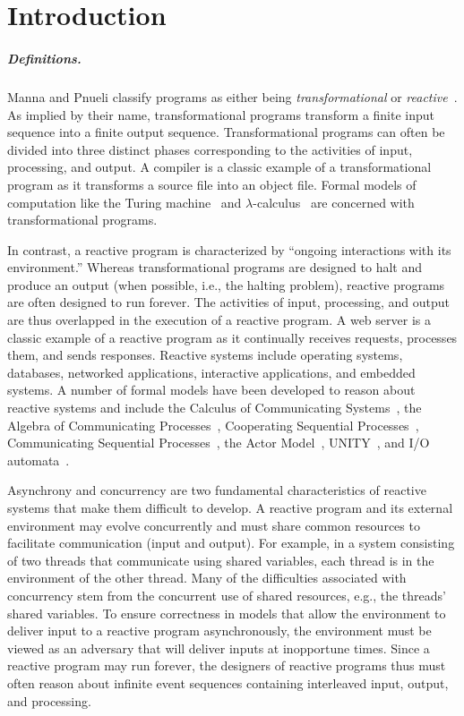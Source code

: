 \chapter{Introduction \label{introduction}}

\paragraph{Definitions.}
Manna and Pnueli classify programs as either being \emph{transformational} or \emph{reactive}~\cite{manna1992temporal}.
As implied by their name, transformational programs transform a finite input sequence into a finite output sequence.
Transformational programs can often be divided into three distinct phases corresponding to the activities of input, processing, and output.
A compiler is a classic example of a transformational program as it transforms a source file into an object file.
Formal models of computation like the Turing machine~\cite{turing1936computable} and $\lambda$-calculus~\cite{church1936unsolvable} are concerned with transformational programs.

In contrast, a reactive program is characterized by ``ongoing interactions with its environment\cite{manna1992temporal}.''
Whereas transformational programs are designed to halt and produce an output (when possible, i.e., the halting problem), reactive programs are often designed to run forever.
The activities of input, processing, and output are thus overlapped in the execution of a reactive program.
A web server is a classic example of a reactive program as it continually receives requests, processes them, and sends responses.
Reactive systems include operating systems, databases, networked applications, interactive applications, and embedded systems.
A number of formal models have been developed to reason about reactive systems and include the Calculus of Communicating Systems~\cite{milner1982calculus}, the Algebra of Communicating Processes~\cite{bergstra1982fixed}, Cooperating Sequential Processes~\cite{dijkstra1965cooperating}, Communicating Sequential Processes~\cite{hoare1978communicating}, the Actor Model~\cite{hewitt1973universal}\cite{clinger1981foundations}\cite{agha1985actors}, UNITY~\cite{chandy1989parallel}, and I/O automata~\cite{nancy1996distributed}.

Asynchrony and concurrency are two fundamental characteristics of reactive systems that make them difficult to develop.
A reactive program and its external environment may evolve concurrently and must share common resources to facilitate communication (input and output).
For example, in a system consisting of two threads that communicate using shared variables, each thread is in the environment of the other thread.
Many of the difficulties associated with concurrency stem from the concurrent use of shared resources, e.g., the threads' shared variables.
To ensure correctness in models that allow the environment to deliver input to a reactive program asynchronously, the environment must be viewed as an adversary that will deliver inputs at inopportune times.
Since a reactive program may run forever, the designers of reactive programs thus must often reason about infinite event sequences containing interleaved input, output, and processing.

